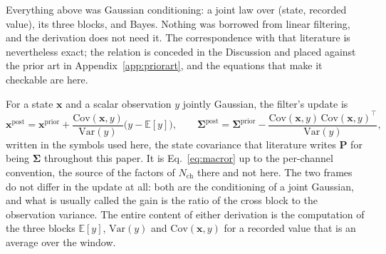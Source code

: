 \begin{appendixbox}
Everything above was Gaussian conditioning: a joint law over (state, recorded value), its three
blocks, and Bayes. Nothing was borrowed from linear filtering, and the derivation does not need it.
The correspondence with that literature is nevertheless exact; the relation is conceded in the
Discussion and placed against the prior art in Appendix~\ref{app:priorart}, and the equations that
make it checkable are here.

For a state $\mathbf{x}$ and a scalar observation $y$ jointly Gaussian, the filter's update is
\begin{equation}
  \mathbf{x}^{\mathrm{post}}=\mathbf{x}^{\mathrm{prior}}
    +\frac{\mathrm{Cov}(\mathbf{x},y)}{\mathrm{Var}(y)}\bigl(y-\mathbb{E}[y]\bigr),
  \qquad
  \boldsymbol{\Sigma}^{\mathrm{post}}=\boldsymbol{\Sigma}^{\mathrm{prior}}
    -\frac{\mathrm{Cov}(\mathbf{x},y)\,\mathrm{Cov}(\mathbf{x},y)^\top}{\mathrm{Var}(y)} ,
  \label{eq:kf}
\end{equation}
written in the symbols used here, the state covariance that literature writes $\mathbf{P}$ for
being $\boldsymbol{\Sigma}$ throughout this paper. It is Eq.~\ref{eq:macror} up to the per-channel convention, the source of the factors of
$N_{\mathrm{ch}}$ there and not here. The two frames do not differ in the update at all: both are
the conditioning of a joint Gaussian, and what is usually called the gain is the ratio of the cross
block to the observation variance. The entire content of either derivation is the computation of
the three blocks $\mathbb{E}[y]$, $\mathrm{Var}(y)$ and $\mathrm{Cov}(\mathbf{x},y)$ for a recorded
value that is an average over the window.


\end{appendixbox}
